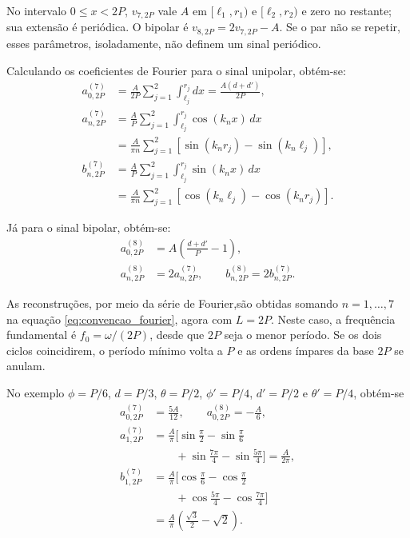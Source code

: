 No intervalo $0\leq x<2P$, $v_{7,2P}$ vale $A$ em
$[\ell_1,r_1)$ e $[\ell_2,r_2)$ e zero no restante; sua extensão é
periódica. O bipolar é $v_{8,2P}=2v_{7,2P}-A$. Se o par não se repetir,
esses parâmetros, isoladamente, não definem um sinal periódico.

Calculando os coeficientes de Fourier para o sinal unipolar, obtém-se:
\begin{equation}
    \begin{aligned}
        a_{0,2P}^{(7)}&=\frac{A}{2P}\sum_{j=1}^{2}\int_{\ell_j}^{r_j}\!dx
            =\frac{A(d+d')}{2P}, \\
        a_{n,2P}^{(7)}&=\frac{A}{P}\sum_{j=1}^{2}
            \int_{\ell_j}^{r_j}\cos(k_nx)\,dx \\
            &=\frac{A}{\pi n}\sum_{j=1}^{2}
                [\sin(k_nr_j)-\sin(k_n\ell_j)], \\
        b_{n,2P}^{(7)}&=\frac{A}{P}\sum_{j=1}^{2}
            \int_{\ell_j}^{r_j}\sin(k_nx)\,dx \\
            &=\frac{A}{\pi n}\sum_{j=1}^{2}
                [\cos(k_n\ell_j)-\cos(k_nr_j)].
    \end{aligned}
\end{equation}

Já para o sinal bipolar, obtém-se:
\begin{equation}
    \begin{aligned}
        a_{0,2P}^{(8)}&=A\left(\frac{d+d'}{P}-1\right), \\
        a_{n,2P}^{(8)}&=2a_{n,2P}^{(7)}, \qquad
        b_{n,2P}^{(8)}=2b_{n,2P}^{(7)}.
    \end{aligned}
\end{equation}

As reconstruções, por meio da série de Fourier,são obtidas somando $n=1,\ldots,7$ na
equação \ref{eq:convencao_fourier}, agora com $L=2P$.
Neste caso, a frequência fundamental é $f_0=\omega/(2P)$, desde que
$2P$ seja o menor período. Se os dois ciclos coincidirem, o período
mínimo volta a $P$ e as ordens ímpares da base $2P$ se anulam.

No exemplo $\phi=P/6$, $d=P/3$, $\theta=P/2$,
$\phi'=P/4$, $d'=P/2$ e $\theta'=P/4$, obtém-se
\begin{equation}
    \begin{aligned}
        a_{0,2P}^{(7)}&=\frac{5A}{12}, \qquad
        a_{0,2P}^{(8)}=-\frac{A}{6}, \\
        a_{1,2P}^{(7)}&=\frac{A}{\pi}\biggl[
            \sin\frac{\pi}{2}-\sin\frac{\pi}{6} \\
            &\qquad {}+\sin\frac{7\pi}{4}-\sin\frac{5\pi}{4}\biggr]
            =\frac{A}{2\pi}, \\
        b_{1,2P}^{(7)}&=\frac{A}{\pi}\biggl[
            \cos\frac{\pi}{6}-\cos\frac{\pi}{2} \\
            &\qquad {}+\cos\frac{5\pi}{4}-\cos\frac{7\pi}{4}\biggr] \\
            &=\frac{A}{\pi}\left(\frac{\sqrt{3}}{2}-\sqrt{2}\right).
    \end{aligned}
\end{equation}


